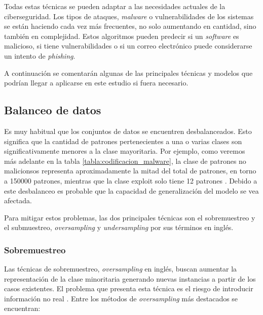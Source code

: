 \vspace{1em}

Todas estas técnicas se pueden adaptar a las necesidades actuales de la ciberseguridad. Los tipos de ataques, \textit{malware} o vulnerabilidades de los sistemas se están haciendo cada vez más frecuentes, no solo aumentando en cantidad, sino también en complejidad. Estos algoritmos pueden predecir si un \textit{software} es malicioso, si tiene vulnerabilidades o si un correo electrónico puede considerarse un intento de \textit{phishing}.

\vspace{1em}

A continuación se comentarán algunas de las principales técnicas y modelos que podrían llegar a aplicarse en este estudio si fuera necesario.

\subsection{Balanceo de datos}
\label{subsec:balanceo}

Es muy habitual que los conjuntos de datos se encuentren desbalanceados. Esto significa que la cantidad de patrones pertenecientes a una o varias clases son significativamente menores a la clase mayoritaria. Por ejemplo, como veremos más adelante en la tabla \ref{tabla:codificacion_malware}, la clase de patrones no malicionsos representa aproximadamente la mitad del total de patrones, en torno a 150000 patrones, mientras que la clase exploit solo tiene 12 patrones \cite{balanceo}. Debido a este desbalanceo es probable que la capacidad de generalización del modelo se vea afectada.

\vspace{1em}

Para mitigar estos problemas, las dos principales técnicas son el sobremuestreo y el submuestreo, \textit{oversampling} y \textit{undersampling} por sus términos en inglés.

\subsubsection{Sobremuestreo}
\label{subsubsec:oversampling}

Las técnicas de sobremuestreo, \textit{oversampling} en inglés, buscan aumentar la representación de la clase minoritaria generando nuevas instancias a partir de los casos existentes. El problema que presenta esta técnica es el riesgo de introducir información no real \cite{resamplig}. Entre los métodos de \textit{oversampling} más destacados se encuentran:

